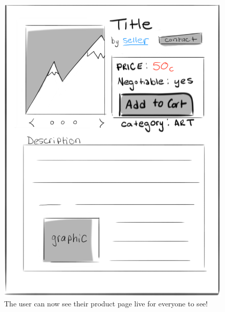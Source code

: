 \documentclass[]{article}
\begin{document}
\begin{enumerate}
			\begin{figure}
				\includegraphics[width=\linewidth]{./pictures/product.png}
				\caption{The user can now see their product page live for everyone to see!}
				\label{fig:seller5}
			\end{figure}
			

\end{enumerate}
\end{document}
